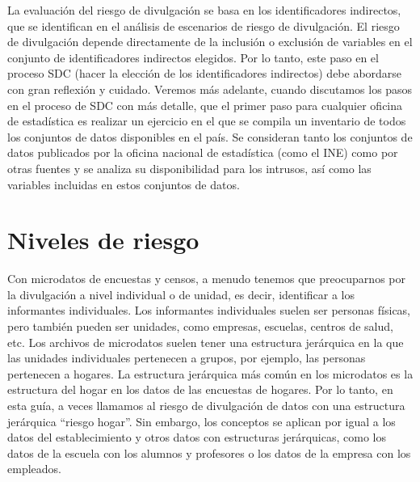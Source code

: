 \documentclass[
]{book}
\theoremstyle{definition}
\theoremstyle{definition}
\theoremstyle{definition}
\theoremstyle{definition}
\theoremstyle{remark}
\begin{document}
La evaluación del riesgo de divulgación se basa en los identificadores indirectos, que se identifican en el análisis de escenarios de riesgo de divulgación. El riesgo de divulgación depende directamente de la inclusión o exclusión de variables en el conjunto de identificadores indirectos elegidos. Por lo tanto, este paso en el proceso SDC (hacer la elección de los identificadores indirectos) debe abordarse con gran reflexión y cuidado. Veremos más adelante, cuando discutamos los pasos en el proceso de SDC con más detalle, que el primer paso para cualquier oficina de estadística es realizar un ejercicio en el que se compila un inventario de todos los conjuntos de datos disponibles en el país. Se consideran tanto los conjuntos de datos publicados por la oficina nacional de estadística (como el INE) como por otras fuentes y se analiza su disponibilidad para los intrusos, así como las variables incluidas en estos conjuntos de datos.

\hypertarget{niveles-de-riesgo}{%
\section{Niveles de riesgo}\label{niveles-de-riesgo}}

Con microdatos de encuestas y censos, a menudo tenemos que preocuparnos por la divulgación a nivel individual o de unidad, es decir, identificar a los informantes individuales. Los informantes individuales suelen ser personas físicas, pero también pueden ser unidades, como empresas, escuelas, centros de salud, etc. Los archivos de microdatos suelen tener una estructura jerárquica en la que las unidades individuales pertenecen a grupos, por ejemplo, las personas pertenecen a hogares. La estructura jerárquica más común en los microdatos es la estructura del hogar en los datos de las encuestas de hogares. Por lo tanto, en esta guía, a veces llamamos al riesgo de divulgación de datos con una estructura jerárquica ``riesgo hogar''. Sin embargo, los conceptos se aplican por igual a los datos del establecimiento y otros datos con estructuras jerárquicas, como los datos de la escuela con los alumnos y profesores o los datos de la empresa con los empleados.
\end{document}
